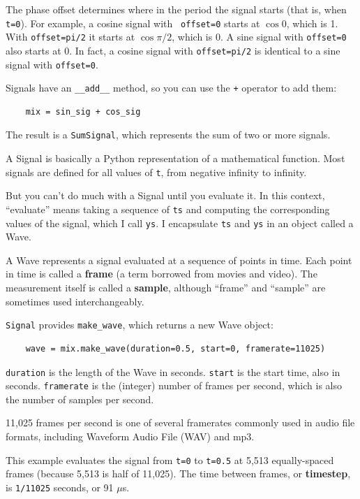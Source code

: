 \documentclass[12pt]{book}
\begin{document}
The phase offset determines where in the period the signal starts
(that is, when {\tt t=0}).  For example, a cosine signal with {\tt
  offset=0} starts at $\cos 0$, which is 1.  With {\tt offset=pi/2} it
starts at $\cos \pi/2$, which is 0.
A sine signal with
{\tt offset=0} also starts at 0.  In fact,
a cosine signal with {\tt offset=pi/2} is identical to a sine
signal with {\tt offset=0}.

Signals have an \verb"__add__" method, so you can use the {\tt +}
operator to add them:

\begin{verbatim}
    mix = sin_sig + cos_sig
\end{verbatim}

The result is a {\tt SumSignal}, which represents the sum of two
or more signals.

A Signal is basically a Python representation of a mathematical
function.  Most signals are defined for all values of {\tt t},
from negative infinity to infinity.

But you can't do much with a
Signal until you evaluate it.
In this context, ``evaluate'' means taking a sequence of {\tt ts}
and computing the corresponding values of the signal, which I
call {\tt ys}.  I encapsulate {\tt ts} and {\tt ys} in an
object called a Wave.

A Wave represents a signal evaluated at a sequence of points in
time.  Each point in time is called a {\bf frame} (a term borrowed
from movies and video).  The measurement itself is called a
{\bf sample}, although ``frame'' and ``sample'' are sometimes
used interchangeably.

{\tt Signal} provides \verb"make_wave", which returns a new
Wave object:

\begin{verbatim}
    wave = mix.make_wave(duration=0.5, start=0, framerate=11025)
\end{verbatim}

{\tt duration} is the length of the Wave in seconds.  {\tt start} is
the start time, also in seconds.  {\tt framerate} is the (integer)
number of frames per second, which is also the number of samples
per second.

11,025 frames per second is one of several framerates commonly used in
audio file formats, including Waveform Audio File (WAV) and mp3. 

This example evaluates the signal from {\tt t=0} to {\tt t=0.5} at
5,513 equally-spaced frames (because 5,513 is half of 11,025).
The time between frames, or {\bf timestep}, is {\tt 1/11025} seconds, or
91 $\mu$s.
\end{document}
